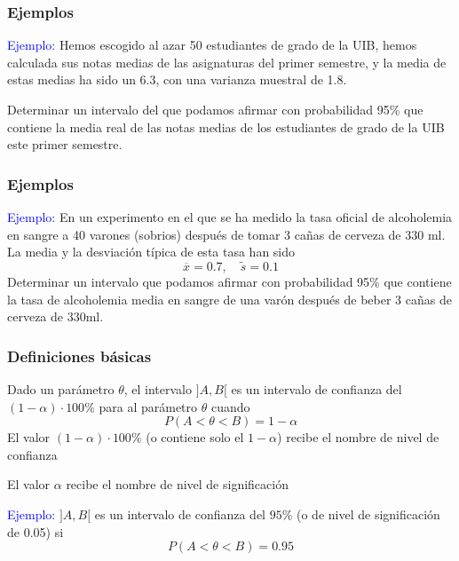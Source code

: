 \documentclass[12pt,t]{beamer}
\newcommand{\blue}[1]{\textcolor{blue}{#1}}
\renewcommand{\emph}[1]{{\color{red}#1}}
\theoremstyle{plain}
\theoremstyle{definition}
\begin{document}
\begin{frame}
\frametitle{Ejemplos}


\blue{Ejemplo:} 
Hemos escogido al azar 50 estudiantes de grado de la UIB, hemos calculada sus notas medias de las asignaturas del primer semestre, y la media de estas medias ha sido un 6.3, con una varianza muestral de 1.8.\medskip

Determinar un intervalo del que podamos afirmar con probabilidad 95\% que contiene la media real de las notas medias de los estudiantes de grado de la UIB este primer semestre.
\end{frame}


\begin{frame}
\frametitle{Ejemplos}

\blue{Ejemplo:} En un experimento en el que se ha medido la tasa oficial  de  alcoholemia en sangre a 40 varones (sobrios) después de tomar 3 cañas de cerveza de 330 ml.
La media y la desviación típica de esta tasa han sido
$$
\overline{x}=0.7,\quad \widetilde{s}=0.1
$$
Determinar un intervalo que podamos afirmar con probabilidad 95\% que contiene la tasa de alcoholemia media en sangre de una varón  después de beber 3  cañas de cerveza de 330ml.
\end{frame}




\begin{frame}
\frametitle{Definiciones básicas}

Dado un parámetro $\theta$, el intervalo $]A,B[$ es un \emph{intervalo de confianza} del
$(1-\alpha)\cdot 100\% $ para al parámetro $\theta$ cuando
$$
P(A<\theta<B)=1-\alpha
$$
El valor $(1-\alpha)\cdot 100\% $ (o contiene solo el $1-\alpha$) recibe el nombre de \emph{nivel de confianza} 
\medskip

El valor $\alpha$ recibe el nombre de \emph{nivel de significación}
\medskip 


\blue{Ejemplo:} $]A,B[$ es un intervalo de confianza del $95\%$ (o de nivel de significación de 0.05) si
$$
P(A<\theta<B)=0.95
$$
\end{frame}
\end{document}
